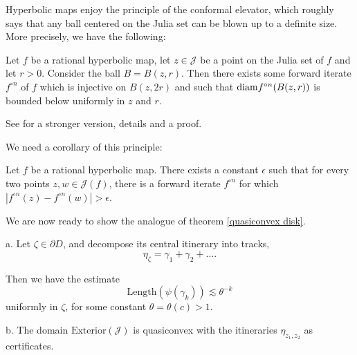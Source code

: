Hyperbolic maps enjoy the principle of the conformal elevator, which roughly says that any ball centered on the Julia set can be blown up to a definite size. More precisely, we have the following:

\begin{proposition} \label{elevator}
	Let $f$ be a rational hyperbolic map, let $z\in \mathcal J$ be a point on the Julia set of $f$ and let $r>0$. Consider the ball $B=B(z,r)$. Then there exists some forward iterate $f^{\circ n}$ of $f$ which is injective on $B(z,2r)$ and such that
	$\mathrm{\mathrm{diam}} {f^{\circ n}(B(z,r))}$ is bounded below uniformly in $z$ and $r$. 
\end{proposition}

See \cite{BLM16} for a stronger version, details and a proof.

We need a corollary of this principle:

\begin{corollary} \label{elevator for points on julia}
	Let $f$ be a rational hyperbolic map. There exists a constant $\epsilon$ such that for every two points $z,w\in\mathcal{J}(f)$, there is a forward iterate
$f^{\circ n}$ for which $\left|f^{\circ n}(z)-f^{\circ n}(w)\right|>\epsilon$.	
\end{corollary}

\begin{comment}
\begin{proof}
	Apply proposition \ref{elevator} to a ball centered on the Julia set which contains $z,w$ on its boundary at roughly antipodal points. After blowing up we get points $f^{\circ n}(z),f^{\circ n}(w)$ which are a definite distance apart by Koebe's distortion theorem. /TODO: make this correct/
\end{proof}
\end{comment}

We are now ready to show the analogue of theorem \ref{quasiconvex disk}.
\begin{theorem} 
a. Let $\zeta\in\partial{D}$, and decompose its central itinerary into tracks, 
$$\eta_\zeta = \gamma _1 +\gamma_2 +\ldots.$$

Then we have the estimate
$$\mathrm{Length}(\psi(\gamma_{k}))\lesssim\theta^{-k}$$ uniformly in
$\zeta$, for some constant $\theta=\theta(c)>1$.

b. The domain $\mathrm{Exterior}(\mathcal{J})$ is quasiconvex  with the itineraries $\eta_{z_1,z_2}$ as certificates.
\end{theorem}

